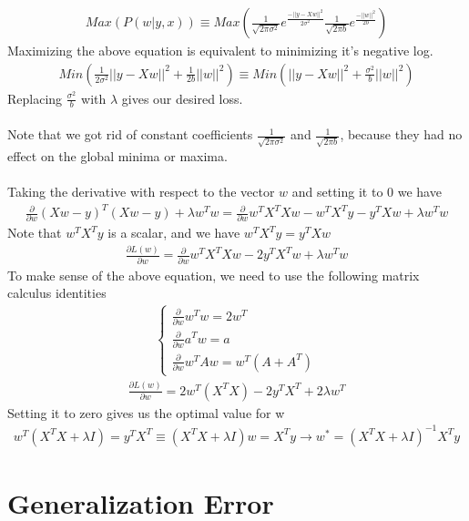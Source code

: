 \documentclass[12pt,onecolumn,a4paper]{article}
\begin{document}
\begin{align*}
	Max(P(w|y,x)) \equiv Max (\frac{1}{\sqrt{2\pi \sigma^2}} e^{\frac{- ||y - Xw||^2}{2\sigma^2}}
	\frac{1}{\sqrt{2 \pi b}} e^{\frac{- ||w||^2}{2b}})
\end{align*}
Maximizing the above equation is equivalent to minimizing it's negative log.
\begin{align*}
	Min(\frac{1}{2\sigma^2}||y - Xw||^2 + \frac{1}{2b} ||w||^2) \equiv Min(||y - Xw||^2 + \frac{\sigma^2}{b} ||w||^2)
\end{align*} 
Replacing $\frac{\sigma^2}{b}$ with $\lambda$ gives our desired loss.
\\ \\
Note that we got rid of constant coefficients $\frac{1}{\sqrt{2\pi \sigma^2}}$ and $\frac{1}{\sqrt{2\pi b}}$, because they had no effect on the global minima or maxima.
\\ \\
Taking the derivative with respect to the vector $w$ and setting it to 0 we have 
\begin{align*}
	\frac {\partial} {\partial{w}} (Xw - y)^T(Xw - y) + \lambda w^Tw = \frac{\partial}{\partial w} w^TX^TXw - w^TX^Ty - y^TXw + \lambda w^Tw
\end{align*}
Note that $w^T X^T y$ is a scalar, and we have $w^T X^T y = y^T X w$
\begin{align*}
	\frac{\partial L(w)}{\partial w} = \frac{\partial}{\partial w} w^TX^TXw - 2y^TX^Tw + \lambda w^Tw
\end{align*}
To make sense of the above equation, we need to use the following matrix calculus identities
\begin{align*}
	\begin{cases} 
		\frac{\partial}{\partial w} w^T w = 2w^T \\
		\frac{\partial}{\partial w} a^T w = a \\
		\frac{\partial}{\partial w} w^T A w = w^T (A + A^T)
	\end{cases}
\end{align*}
\begin{align*}
	\frac{\partial L(w)}{\partial w} = 2w^T(X^TX) - 2y^TX^T + 2\lambda w^T
\end{align*}
Setting it to zero gives us the optimal value for w
\begin{align*}
	w^T(X^TX + \lambda I) = y^T X^T \equiv (X^T X + \lambda I)w = X^T y \rightarrow w^{*} = (X^T X + \lambda I)^{-1} X^T y
\end{align*}
\section{Generalization Error}
\end{document}
